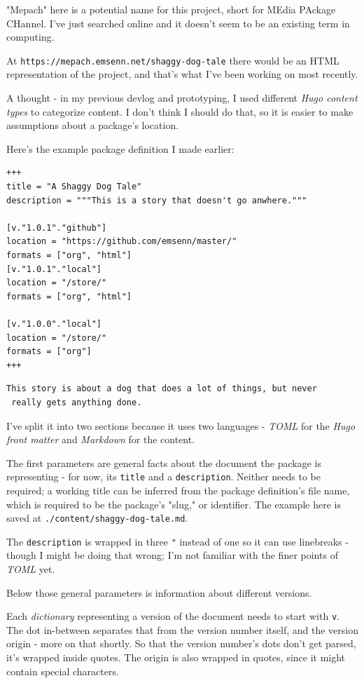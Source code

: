 \documentclass[11pt]{article}
\begin{document}
"Mepach" here is a potential name for this project, short for MEdia
PAckage CHannel. I've just searched online and it doesn't seem to be
an existing term in computing.

At \texttt{https://mepach.emsenn.net/shaggy-dog-tale} there would be an HTML
representation of the project, and that's what I've been working on
most recently.

A thought - in my previous devlog and prototyping, I used different
\emph{Hugo content types} to categorize content. I don't think I should do
that, so it is easier to make assumptions about a package's location.

Here's the example package definition I made earlier:

\begin{verbatim}
+++
title = "A Shaggy Dog Tale"
description = """This is a story that doesn't go anwhere."""

[v."1.0.1"."github"]
location = "https://github.com/emsenn/master/"
formats = ["org", "html"]
[v."1.0.1"."local"]
location = "/store/"
formats = ["org", "html"]

[v."1.0.0"."local"]
location = "/store/"
formats = ["org"]
+++
\end{verbatim}
\begin{verbatim}
This story is about a dog that does a lot of things, but never
 really gets anything done.
\end{verbatim}

I've split it into two sections because it uses two languages - \emph{TOML}
for the \emph{Hugo front matter} and \emph{Markdown} for the content.

The first parameters are general facts about the document the package
is representing - for now, its \texttt{title} and a \texttt{description}. Neither
needs to be required; a working title can be inferred from the package
definition's file name, which is required to be the package's "slug,"
or identifier. The example here is saved at
\texttt{./content/shaggy-dog-tale.md}.

The \texttt{description} is wrapped in three \texttt{"} instead of one so it can use
linebreaks - though I might be doing that wrong; I'm not familiar with
the finer points of \emph{TOML} yet.

Below those general parameters is information about different
versions.

Each \emph{dictionary} representing a version of the document needs to
start with \texttt{v}. The dot in-between separates that from the version
number itself, and the version origin - more on that shortly. So that
the version number's dots don't get parsed, it's wrapped inside
quotes. The origin is also wrapped in quotes, since it might contain
special characters.
\end{document}
